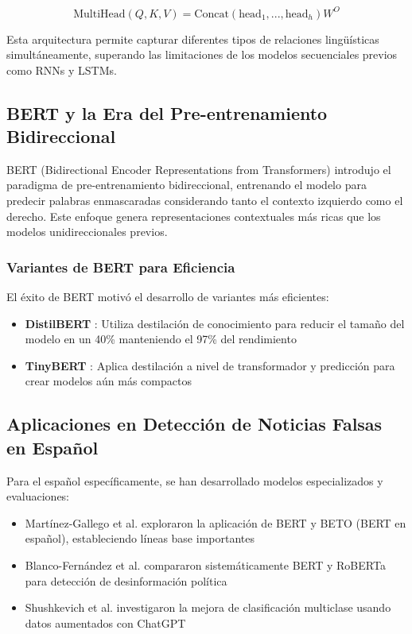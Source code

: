 \begin{equation}
\text{MultiHead}(Q,K,V) = \text{Concat}(\text{head}_1, ..., \text{head}_h)W^O
\end{equation}

Esta arquitectura permite capturar diferentes tipos de relaciones lingüísticas simultáneamente, superando las limitaciones de los modelos secuenciales previos como RNNs y LSTMs.

\subsection{BERT y la Era del Pre-entrenamiento Bidireccional}

BERT (Bidirectional Encoder Representations from Transformers) \cite{devlin2018bert} introdujo el paradigma de pre-entrenamiento bidireccional, entrenando el modelo para predecir palabras enmascaradas considerando tanto el contexto izquierdo como el derecho. Este enfoque genera representaciones contextuales más ricas que los modelos unidireccionales previos.

\subsubsection{Variantes de BERT para Eficiencia}

El éxito de BERT motivó el desarrollo de variantes más eficientes:
\begin{itemize}
    \item \textbf{DistilBERT} \cite{sanh2019distilbert}: Utiliza destilación de conocimiento para reducir el tamaño del modelo en un 40\% manteniendo el 97\% del rendimiento
    \item \textbf{TinyBERT} \cite{jiao2019tinybert}: Aplica destilación a nivel de transformador y predicción para crear modelos aún más compactos
\end{itemize}

\subsection{Aplicaciones en Detección de Noticias Falsas en Español}

Para el español específicamente, se han desarrollado modelos especializados y evaluaciones:
\begin{itemize}
    \item Martínez-Gallego et al. \cite{martinez2021fake} exploraron la aplicación de BERT y BETO (BERT en español), estableciendo líneas base importantes
    \item Blanco-Fernández et al. \cite{blanco2024enhancing} compararon sistemáticamente BERT y RoBERTa para detección de desinformación política
    \item Shushkevich et al. \cite{shushkevich2023improving} investigaron la mejora de clasificación multiclase usando datos aumentados con ChatGPT
\end{itemize}

